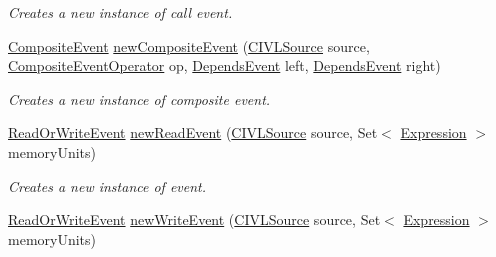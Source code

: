 \begin{DoxyCompactItemize}
\begin{DoxyCompactList}\small\item\em Creates a new instance of call event. \end{DoxyCompactList}\item 
\hyperlink{interfaceedu_1_1udel_1_1cis_1_1vsl_1_1civl_1_1model_1_1IF_1_1contract_1_1CompositeEvent}{Composite\+Event} \hyperlink{classedu_1_1udel_1_1cis_1_1vsl_1_1civl_1_1model_1_1common_1_1contract_1_1CommonContractFactory_ab92b884f3ec5c2eb2c147e80d3a78e77}{new\+Composite\+Event} (\hyperlink{interfaceedu_1_1udel_1_1cis_1_1vsl_1_1civl_1_1model_1_1IF_1_1CIVLSource}{C\+I\+V\+L\+Source} source, \hyperlink{enumedu_1_1udel_1_1cis_1_1vsl_1_1civl_1_1model_1_1IF_1_1contract_1_1CompositeEvent_1_1CompositeEventOperator}{Composite\+Event\+Operator} op, \hyperlink{interfaceedu_1_1udel_1_1cis_1_1vsl_1_1civl_1_1model_1_1IF_1_1contract_1_1DependsEvent}{Depends\+Event} left, \hyperlink{interfaceedu_1_1udel_1_1cis_1_1vsl_1_1civl_1_1model_1_1IF_1_1contract_1_1DependsEvent}{Depends\+Event} right)
\begin{DoxyCompactList}\small\item\em Creates a new instance of composite event. \end{DoxyCompactList}\item 
\hyperlink{interfaceedu_1_1udel_1_1cis_1_1vsl_1_1civl_1_1model_1_1IF_1_1contract_1_1ReadOrWriteEvent}{Read\+Or\+Write\+Event} \hyperlink{classedu_1_1udel_1_1cis_1_1vsl_1_1civl_1_1model_1_1common_1_1contract_1_1CommonContractFactory_a0c42e3c7a8a26ca1bfd3af5b266338f1}{new\+Read\+Event} (\hyperlink{interfaceedu_1_1udel_1_1cis_1_1vsl_1_1civl_1_1model_1_1IF_1_1CIVLSource}{C\+I\+V\+L\+Source} source, Set$<$ \hyperlink{interfaceedu_1_1udel_1_1cis_1_1vsl_1_1civl_1_1model_1_1IF_1_1expression_1_1Expression}{Expression} $>$ memory\+Units)
\begin{DoxyCompactList}\small\item\em Creates a new instance of {\ttfamily } event. \end{DoxyCompactList}\item 
\hyperlink{interfaceedu_1_1udel_1_1cis_1_1vsl_1_1civl_1_1model_1_1IF_1_1contract_1_1ReadOrWriteEvent}{Read\+Or\+Write\+Event} \hyperlink{classedu_1_1udel_1_1cis_1_1vsl_1_1civl_1_1model_1_1common_1_1contract_1_1CommonContractFactory_a0e5283ebfd0e5a5a4d30e416eda3b3d4}{new\+Write\+Event} (\hyperlink{interfaceedu_1_1udel_1_1cis_1_1vsl_1_1civl_1_1model_1_1IF_1_1CIVLSource}{C\+I\+V\+L\+Source} source, Set$<$ \hyperlink{interfaceedu_1_1udel_1_1cis_1_1vsl_1_1civl_1_1model_1_1IF_1_1expression_1_1Expression}{Expression} $>$ memory\+Units)

\end{DoxyCompactItemize}

